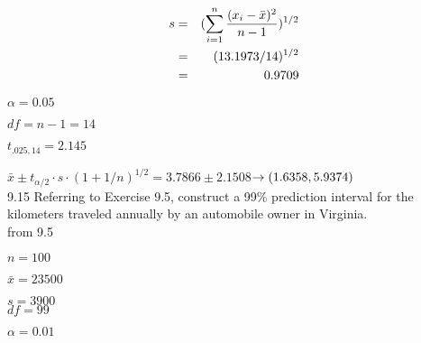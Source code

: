 \begin{eqnarray*}
s & = & (\sum^n_{i = 1} \frac{(x_i - \bar{x})^2}{n-1})^{1/2} \\
& = & (13.1973/14)^{1/2} \\
& = & 0.9709
\end{eqnarray*}

$\alpha = 0.05$

$df = n - 1 = 14$

$t_{.025,14} = 2.145$

$\bar{x} \pm t_{\alpha/2} \cdot s \cdot (1 + 1/n)^{1/2} $$= 3.7866 \pm 2.1508 $$\rightarrow (1.6358, 5.9374)$ \\

9.15 Referring to Exercise 9.5, construct a 99\% prediction interval for the kilometers traveled annually by an automobile owner in Virginia. \\

from 9.5 

$n = 100$ 

$\bar{x} = 23500$

$s = 3900$ \\

$df = 99$ 

$\alpha = 0.01$

